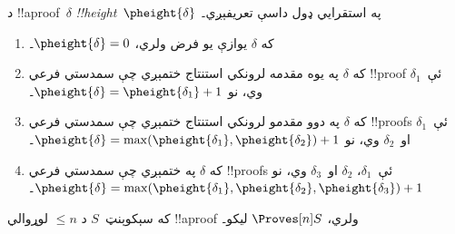 \documentclass[../../../include/open-logic-section]{subfiles}
\begin{document}
\begin{defn}
د !!a{proof}~$\delta$ \emph{!!{height}}~$\pheight{\delta}$
په استقرايي ډول داسې تعريفېږي۔
\begin{enumerate}
  \item که $\delta$ يوازې يو فرض ولري، $\pheight{\delta} = 0$۔
  \item که $\delta$ په يوه مقدمه لرونکي استنتاج ختمېږي چې
  سمدستي فرعي !!{proof} ئې~$\delta_1$ وي، نو
  $\pheight{\delta} = \pheight{\delta_1} + 1$۔
  \item که $\delta$ په دوو مقدمو لرونکي استنتاج ختمېږي چې
  سمدستي فرعي !!{proof}s ئې~$\delta_1$ او~$\delta_2$ وي، نو
  $\pheight{\delta} =
  \max(\pheight{\delta_1}, \pheight{\delta_2}) + 1$۔
  \item که $\delta$ په \Elim{\lor} ختمېږي چې سمدستي فرعي
  !!{proof}s ئې~$\delta_1$، $\delta_2$ او~$\delta_3$ وي، نو
  $\pheight{\delta} =
  \max(\pheight{\delta_1}, \pheight{\delta_2}, \pheight{\delta_3}) + 1$۔
\end{enumerate}
که سېکوېنټ~$S$ د $\le n$ لوړوالي !!a{proof} ولري،
$\Proves[n] S$ ليکو۔
\end{defn}
\end{document}
